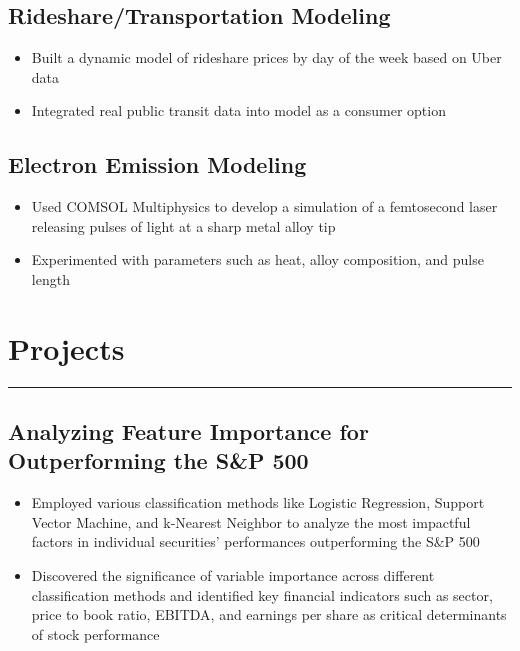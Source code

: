 \documentclass[11pt,a4paper]{article}
\newenvironment{myitemize}
{ \begin{itemize}[label={--}, leftmargin=*]
    \setlength{\itemsep}{0pt}
    \setlength{\parskip}{0pt}
    \setlength{\parsep}{0pt}     }
{ \end{itemize}                  }
\begin{document}
\subsection*{Rideshare/Transportation Modeling \hfill {} }

\begin{myitemize}
\item Built a dynamic model of rideshare prices by day of the week based on Uber data
\item Integrated real public transit data into model as a consumer option
\end{myitemize}

\subsection*{Electron Emission Modeling \hfill {} }

\begin{myitemize}
\item Used COMSOL Multiphysics to develop a simulation of a femtosecond laser releasing
pulses of light at a sharp metal alloy tip
\item Experimented with parameters such as heat, alloy composition, and pulse length
\end{myitemize}


\section*{Projects}
\vspace{-3mm} %
\hrule
\vspace{3mm} %

\subsection*{Analyzing Feature Importance for Outperforming the S\&P 500 \hfill {} }

\begin{myitemize}
\item Employed various classification methods like Logistic Regression, Support Vector Machine, and k-Nearest Neighbor to analyze the most impactful factors in individual securities' performances outperforming the S\&P 500
\item Discovered the significance of variable importance across different classification methods and identified key financial indicators such as sector, price to book ratio, EBITDA, and earnings per share as critical determinants of stock performance
\end{myitemize}
\end{document}
